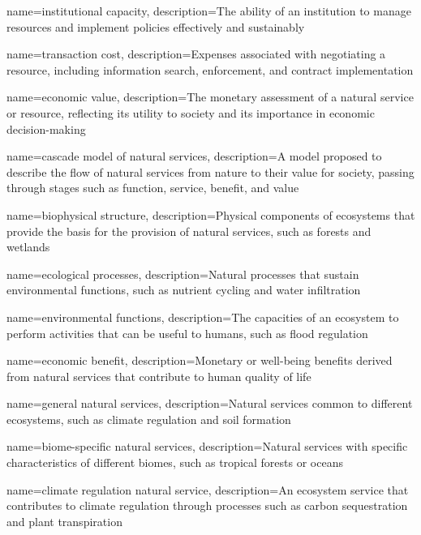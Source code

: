 {
	name=institutional capacity,
	description={The ability of an institution to manage resources and implement policies effectively and sustainably}
}

{
	name=transaction cost,
	description={Expenses associated with negotiating a resource, including information search, enforcement, and contract implementation}
}

{
	name=economic value,
	description={The monetary assessment of a natural service or resource, reflecting its utility to society and its importance in economic decision-making}
}

{
	name=cascade model of natural services,
	description={A model proposed to describe the flow of natural services from nature to their value for society, passing through stages such as function, service, benefit, and value}
}

{
	name=biophysical structure,
	description={Physical components of ecosystems that provide the basis for the provision of natural services, such as forests and wetlands}
}

{
	name=ecological processes,
	description={Natural processes that sustain environmental functions, such as nutrient cycling and water infiltration}
}

{
	name=environmental functions,
	description={The capacities of an ecosystem to perform activities that can be useful to humans, such as flood regulation}
}

{
	name=economic benefit,
	description={Monetary or well-being benefits derived from natural services that contribute to human quality of life}
}

{
	name=general natural services,
	description={Natural services common to different ecosystems, such as climate regulation and soil formation}
}

{
	name=biome-specific natural services,
	description={Natural services with specific characteristics of different biomes, such as tropical forests or oceans}
}

{
	name=climate regulation natural service,
	description={An ecosystem service that contributes to climate regulation through processes such as carbon sequestration and plant transpiration}
}

